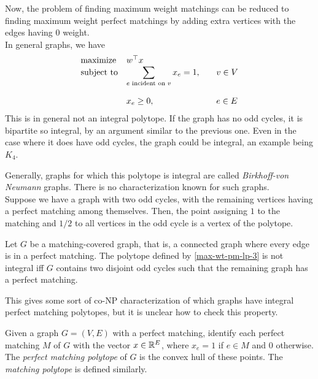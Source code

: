 	Now, the problem of finding maximum weight matchings can be reduced to finding maximum weight perfect matchings by adding extra vertices with the edges having $0$ weight.\\

	In general graphs, we have
	\begin{equation}
	\label{max-wt-pm-lp-3}
	\begin{array}{ll@{}ll}
	\text{maximize}  & w^\top x &\\
	\text{subject to}& \displaystyle\sum\limits_{e \text{ incident on } v} x_{e} = 1,  &\qquad v \in V\\\\
	                 & x_{e} \ge 0,                                                &\qquad e \in E
	\end{array}
	\end{equation}
	This is in general not an integral polytope.
	If the graph has no odd cycles, it is bipartite so integral, by an argument similar to the previous one. Even in the case where it does have odd cycles, the graph could be integral, an example being $K_4$.

	Generally, graphs for which this polytope is integral are called \emph{Birkhoff-von Neumann} graphs. There is no characterization known for such graphs.\\
	Suppose we have a graph with two odd cycles, with the remaining vertices having a perfect matching among themselves. Then, the point assigning $1$ to the matching and $1/2$ to all vertices in the odd cycle is a vertex of the polytope.
	\begin{flem}
		\label{lem:matching-polytope-lem}
		Let $G$ be a matching-covered graph, that is, a connected graph where every edge is in a perfect matching. The polytope defined by \eqref{max-wt-pm-lp-3} is not integral iff $G$ contains two disjoint odd cycles such that the remaining graph has a perfect matching.
	\end{flem}

	This gives some sort of co-\textsf{NP} characterization of which graphs have integral perfect matching polytopes, but it is unclear how to check this property.

	\begin{fdef}
		Given a graph $G = (V,E)$ with a perfect matching, identify each perfect matching $M$ of $G$ with the vector $x \in \mathbb{R}^E$, where $x_e = 1$ if $e \in M$ and $0$ otherwise. The \emph{perfect matching polytope} of $G$ is the convex hull of these points. The \emph{matching polytope} is defined similarly.
	\end{fdef}

